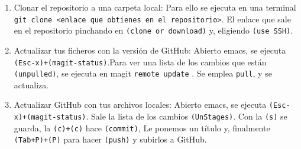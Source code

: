\begin{enumerate}
\item Clonar el repositorio a una carpeta local:
  Para ello se ejecuta en una terminal
  \texttt{git clone <enlace que obtienes en el repositorio>}. El enlace que sale en el
  repositorio pinchando en \texttt{(clone or download)} y, eligiendo \texttt{(use SSH)}.

\item Actualizar tus ficheros con la versión de GitHub:
  Abierto emacs, se ejecuta \texttt{(Esc-x)+(magit-status)}.Para ver una lista de los cambios que
  están \texttt{(unpulled)}, se ejecuta en magit \texttt{remote update} . Se emplea \texttt{pull},
  y se actualiza.
\item Actualizar GitHub con tus archivos locales:
  Abierto emacs, se ejecuta \texttt{(Esc-x)+(magit-status)}. Sale la lista de los cambios
  \texttt{(UnStages)}. Con la \texttt{(s)} se guarda, la \texttt{(c)+(c)} hace \texttt{(commit)},
  Le ponemos un título y, finalmente \texttt{(Tab+P)+(P)} para hacer \texttt{(push)} y subirlos a GitHub.
\end{enumerate}